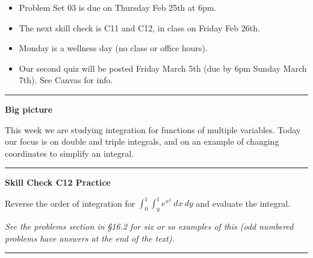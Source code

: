 \documentclass[12pt,letterpaper,noanswers]{exam}
\begin{document}
 \pdfpageheight 11in 
  \pdfpagewidth 8.5in





\begin{itemize}
\itemsep0em
    \item Problem Set 03 is due on Thursday Feb 25th at 6pm.
    \item The next skill check is C11 and C12, in class on Friday Feb 26th.
    \item Monday is a wellness day (no class or office hours).
    \item Our second quiz will be posted Friday March 5th (due by 6pm Sunday March 7th).  See Canvas for info.
\end{itemize}

\hrule
\vspace{0.2cm}


\noindent\textbf{Big picture}

This week we are studying integration for functions of multiple variables.  Today our focus is on double and triple integrals, and on an example of changing coordinates to simplify an integral.


\vspace{0.2cm}
\hrule
\vspace{0.2cm}
\noindent\textbf{Skill Check C12 Practice}

\begin{questions}
\item Reverse the order of integration for $\displaystyle\int_0^1\int_y^1 e^{x^2}\ dx\ dy$ and evaluate the integral.

\emph{See the problems section in \S 16.2 for six or so examples of this (odd numbered problems have answers at the end of the text).}
\end{questions}

\vspace{0.2cm}
\hrule
\vspace{0.2cm}
\end{document}
